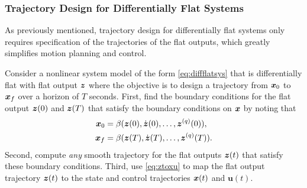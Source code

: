 \subsubsection{Trajectory Design for Differentially Flat Systems}
As previously mentioned, trajectory design for differentially flat systems only requires specification of the trajectories of the flat outputs, which greatly simplifies motion planning and control.

Consider a nonlinear system model of the form \eqref{eq:diffflatsys} that is differentially flat with flat output $\bm{z}$ where the objective is to design a trajectory from $\bm{x}_0$ to $\bm{x}_f$ over a horizon of $T$ seconds. First, find the boundary conditions for the flat output $\bm{z}(0)$ and $\bm{z}(T)$ that satisfy the boundary conditions on $\bm{x}$ by noting that
\begin{equation} \label{eq:flatbc}
\begin{split}
\bm{x}_0 &= \beta (\bm{z}(0),\dot{\bm{z}}(0),\dots,\bm{z}^{(q)}(0)), \\
\bm{x}_f &= \beta (\bm{z}(T),\dot{\bm{z}}(T),\dots,\bm{z}^{(q)}(T)). \\
\end{split}
\end{equation}
Second, compute \textit{any} smooth trajectory for the flat outputs $\bm{z}(t)$ that satisfy these boundary conditions. Third, use \eqref{eq:ztoxu} to map the flat output trajectory $\bm{z}(t)$ to the state and control trajectories $\bm{x}(t)$ and $\bm{u}(t)$.

